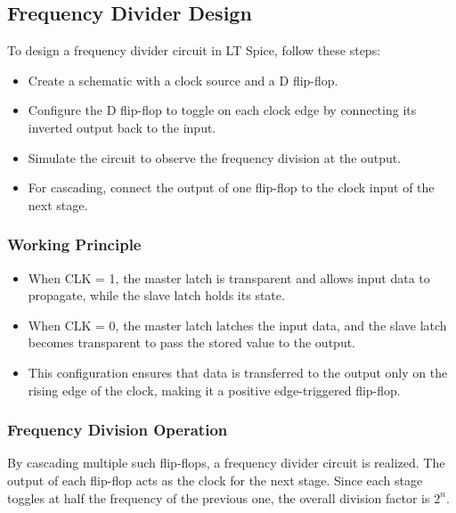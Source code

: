 \subsection{Frequency Divider Design}
\label{sec:freq_div}
To design a frequency divider circuit in LT Spice, follow these steps:
\begin{itemize}
    \item Create a schematic with a clock source and a D flip-flop.
    \item Configure the D flip-flop to toggle on each clock edge by connecting its inverted output back to the input.
    \item Simulate the circuit to observe the frequency division at the output.
    \item For cascading, connect the output of one flip-flop to the clock input of the next stage.
\end{itemize}
\subsubsection*{Working Principle}
\begin{itemize}
    \item When CLK = 1, the master latch is transparent and allows input data to propagate, while the slave latch holds its state.
    \item When CLK = 0, the master latch latches the input data, and the slave latch becomes transparent to pass the stored value to the output.
    \item This configuration ensures that data is transferred to the output only on the rising edge of the clock, making it a positive edge-triggered flip-flop.
\end{itemize}
\subsubsection*{Frequency Division Operation}
By cascading multiple such flip-flops, a frequency divider circuit is realized. The output of each flip-flop acts as the clock for the next stage. Since each stage toggles at half the frequency of the previous one, the overall division factor is \(2^n\).

